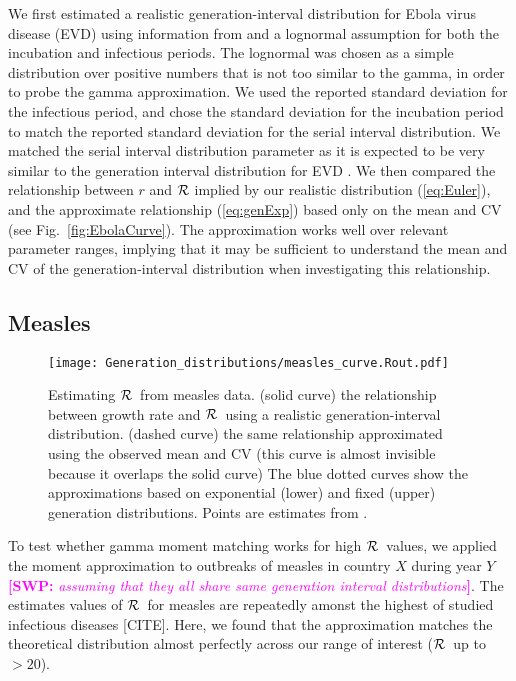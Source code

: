 \documentclass[12pt,]{article}
\newcommand{\RR}{\ensuremath{{\cal R}}}
\newcommand{\eref}[1]{(\ref{eq:#1})}
\newcommand{\fref}[1]{Fig.~\ref{fig:#1}}
\newcommand{\comment}[3]{\textcolor{#1}{\textbf{[#2: }\textit{#3}\textbf{]}}}
\newcommand{\swp}[1]{\comment{magenta}{SWP}{#1}}
\begin{document}
We first estimated a realistic generation-interval distribution for Ebola virus disease (EVD) using information from \cite{WHO14} and a lognormal assumption for both the incubation and infectious periods.
The lognormal was chosen as a simple distribution over positive numbers that is not too similar to the gamma, in order to probe the gamma approximation.
We used the reported standard deviation for the infectious period, and chose the standard deviation for the incubation period to match the reported standard deviation for the serial interval distribution.
We matched the serial interval distribution parameter as it is expected to be very similar to the generation interval distribution for EVD \cite{WHO14}.
We  then compared the relationship between $r$ and $\RR$ implied by our realistic distribution \eref{Euler}, and the approximate relationship \eref{genExp} based only on the mean and CV (see \fref{EbolaCurve}). The approximation works well over relevant parameter ranges, implying that it may be sufficient to understand the mean and CV of the generation-interval distribution when investigating this relationship.

\subsection{Measles}

\begin{figure}[htbp] \centering
	\texttt{[image: Generation\_distributions/measles\_curve.Rout.pdf]}
	\caption{Estimating \RR~from measles data.
		(solid curve) the relationship between growth rate and \RR~using a realistic generation-interval distribution.
		(dashed curve) the same relationship approximated using the observed mean and CV (this curve is almost invisible because it overlaps the solid curve)
		The blue dotted curves show the approximations based on exponential (lower) and fixed (upper) generation distributions.
		Points are estimates from \cite{AndeMay82}.
	}
	\label{fig:measlesCurve}
\end{figure}

To test whether gamma moment matching works for high \RR\ values, we applied the moment approximation to outbreaks of measles in country $X$ during year $Y$ \swp{assuming that they all share same generation interval distributions}. The estimates values of \RR\ for measles are repeatedly amonst the highest of studied infectious diseases [CITE]. Here, we found that the approximation matches the theoretical distribution almost perfectly across our range of interest (\RR\ up to $>20$).
\end{document}
